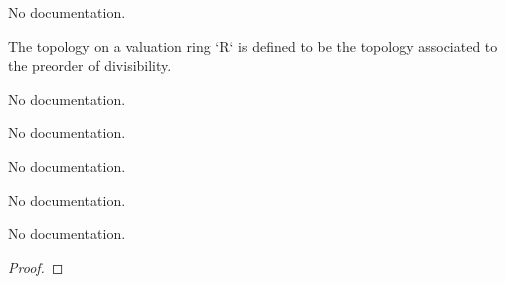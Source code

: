 \begin{theorem}\label{ord_top}
                No documentation.
    \end{theorem}

\begin{definition}\label{ValuationTopology.ValuationRing.setoid}
                The topology on a valuation ring `R` is defined to be the topology associated to the preorder of divisibility.
    \end{definition}

\begin{definition}\label{ValuationTopology.ValuationRing.ValueMonoid}
                No documentation.
    \end{definition}

\begin{definition}\label{CompleteDiscreteValuationRing}
        \leanok
                No documentation.
    \end{definition}

\begin{definition}\label{CompleteValuationField}
        \leanok
                No documentation.
    \end{definition}

\begin{definition}\label{CompleteDiscreteValuationField}
        \leanok
                No documentation.
    \end{definition}

\begin{theorem}\label{sub_of_sum}
        \leanok
                No documentation.
    \end{theorem}

\begin{proof}
    \leanok
\end{proof}

